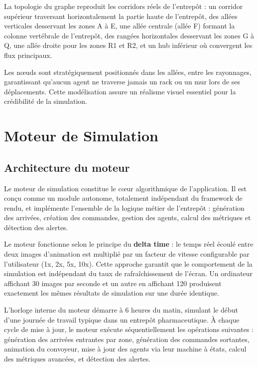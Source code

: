 \documentclass[12pt,a4paper]{report}
\begin{document}
La topologie du graphe reproduit les corridors r\'eels de l'entrep\^ot : un corridor sup\'erieur traversant horizontalement la partie haute de l'entrep\^ot, des all\'ees verticales desservant les zones A \`a E, une all\'ee centrale (all\'ee F) formant la colonne vert\'ebrale de l'entrep\^ot, des rang\'ees horizontales desservant les zones G \`a Q, une all\'ee droite pour les zones R1 et R2, et un hub inf\'erieur o\`u convergent les flux principaux.

Les n\oe uds sont strat\'egiquement positionn\'es dans les all\'ees, entre les rayonnages, garantissant qu'aucun agent ne traverse jamais un rack ou un mur lors de ses d\'eplacements. Cette mod\'elisation assure un r\'ealisme visuel essentiel pour la cr\'edibilit\'e de la simulation.


\chapter{Moteur de Simulation}

\section{Architecture du moteur}

Le moteur de simulation constitue le c\oe ur algorithmique de l'application. Il est con\c{c}u comme un module autonome, totalement ind\'ependant du framework de rendu, et impl\'emente l'ensemble de la logique m\'etier de l'entrep\^ot : g\'en\'eration des arriv\'ees, cr\'eation des commandes, gestion des agents, calcul des m\'etriques et d\'etection des alertes.

Le moteur fonctionne selon le principe du \textbf{delta time} : le temps r\'eel \'ecoul\'e entre deux images d'animation est multipli\'e par un facteur de vitesse configurable par l'utilisateur (1x, 2x, 5x, 10x). Cette approche garantit que le comportement de la simulation est ind\'ependant du taux de rafra\^ichissement de l'\'ecran. Un ordinateur affichant 30 images par seconde et un autre en affichant 120 produisent exactement les m\^emes r\'esultats de simulation sur une dur\'ee identique.

L'horloge interne du moteur d\'emarre \`a 6 heures du matin, simulant le d\'ebut d'une journ\'ee de travail typique dans un entrep\^ot pharmaceutique. \`A chaque cycle de mise \`a jour, le moteur ex\'ecute s\'equentiellement les op\'erations suivantes : g\'en\'eration des arriv\'ees entrantes par zone, g\'en\'eration des commandes sortantes, animation du convoyeur, mise \`a jour des agents via leur machine \`a \'etats, calcul des m\'etriques avanc\'ees, et d\'etection des alertes.
\end{document}
